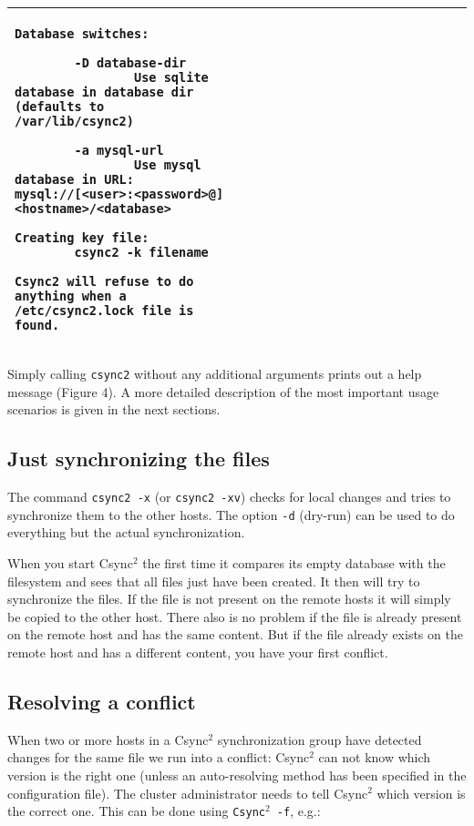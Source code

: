 \documentclass[a4paper,twocolumn]{article}
\def\csync2{{\sc Csync$^{2}$}}
\begin{document}
\begin{figure*}[t]
\begin{center}
\begin{tabular}{|p{0.5\linewidth}|p{0.5\linewidth}|}
\begin{tiny}
\begin{verbatim}
Database switches:

        -D database-dir
                Use sqlite database in database dir (defaults to /var/lib/csync2)

        -a mysql-url
                Use mysql database in URL: mysql://[<user>:<password>@]<hostname>/<database>

Creating key file:
        csync2 -k filename

Csync2 will refuse to do anything when a /etc/csync2.lock file is found.
\end{verbatim}
\end{tiny}
      \tabularnewline
      \hline
    \end{tabular}
  \end{center}
  \caption{The \csync2 help message}
\end{figure*}


Simply calling {\tt csync2} without any additional arguments prints out a
help message (Figure 4). A more detailed description of the most
important usage scenarios is given in the next sections.

\subsection{Just synchronizing the files}

The command {\tt csync2 -x} (or {\tt csync2 -xv}) checks for local changes and
tries to synchronize them to the other hosts. The option {\tt -d} (dry-run) can
be used to do everything but the actual synchronization.

When you start \csync2 the first time it compares its empty database with the
filesystem and sees that all files just have been created. It then will try
to synchronize the files. If the file is not present on the remote hosts it
will simply be copied to the other host. There also is no problem if the file
is already present on the remote host and has the same content. But if the
file already exists on the remote host and has a different content, you
have your first conflict.

\subsection{Resolving a conflict}

When two or more hosts in a \csync2 synchronization group have detected changes
for the same file we run into a conflict: \csync2 can not know which version is
the right one (unless an auto-resolving method has been specified in the
configuration file). The cluster administrator needs to tell \csync2 which
version is the correct one. This can be done using {\tt \csync2 -f}, e.g.:
\end{document}
